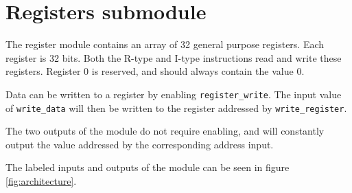 \section{Registers submodule}
The register module contains an array of 32 general purpose registers.
Each register is 32 bits.
Both the R-type and I-type instructions read and write these registers.
Register 0 is reserved, and should always contain the value 0.

Data can be written to a register by enabling \texttt{register\_write}.
The input value of \texttt{write\_data} will then be written to the register addressed by \texttt{write\_register}.

The two outputs of the module do not require enabling,
and will constantly output the value addressed by the corresponding address input.

The labeled inputs and outputs of the module can be seen in figure \ref{fig:architecture}.

